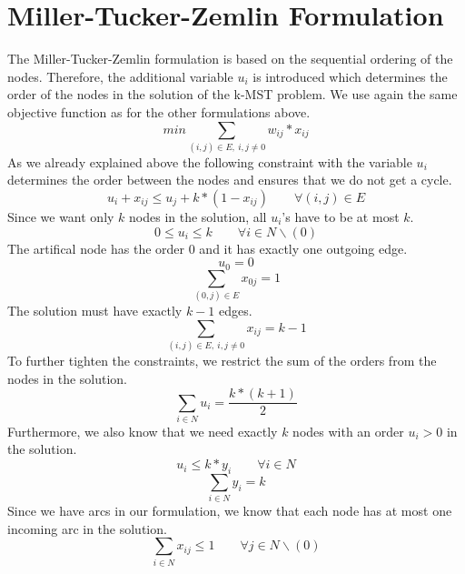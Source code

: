 \documentclass [11pt]{article}
\begin{document}
\section{Miller-Tucker-Zemlin Formulation}
The Miller-Tucker-Zemlin formulation is based on the sequential ordering
of the nodes.
Therefore, the additional variable $u_i$ is introduced
which determines the order of the nodes in the solution
of the k-MST problem.
We use again the same objective function as for the other formulations above.
\begin{equation}
  min \sum_{(i,j) \in E , \ i,j \not = 0} {w_{ij} * x_{ij}}
\end{equation}
As we already explained above the following constraint with the variable
$u_i$ determines the order between the nodes and ensures that we do
not get a cycle.
\begin{equation}
  u_{i} + x_{ij} \leq u_{j} + k*(1- x_{ij}) \qquad \forall (i,j) \in E 
\end{equation}
Since we want only $k$ nodes in the solution, all $u_i$'s have to be
at most $k$.
\begin{equation}
  0 \leq u_i \leq k \qquad \forall i \in N \backslash (0) 
\end{equation}
The artifical node has the order $0$ and it has exactly one outgoing edge.
\begin{equation}
  u_0 = 0 
\end{equation}
\begin{equation}
  \sum_{(0,j) \in E} x_{0j} = 1 
\end{equation}
The solution must have exactly $k-1$ edges.
\begin{equation}
  \sum_{(i,j) \in E, \ i,j \not =  0} x_{ij} = k-1 
\end{equation}
To further tighten the constraints, we restrict the sum of the orders
from the nodes in the solution.
\begin{equation}
  \sum_{i \in N} u_i = \frac{k*(k+1)}{2} 
\end{equation}
Furthermore, we also know that we need exactly $k$ nodes with an
order $u_i > 0$ in the solution.
\begin{equation}
  u_i \leq k*y_i \qquad \forall i \in N
\end{equation}
\begin{equation}
  \sum_{i \in N} y_i = k
\end{equation}
Since we have arcs in our formulation, we know that each node 
has at most one incoming arc in the solution. 
\begin{equation}
  \sum_{i \in N} {x_{ij}} \leq 1 \qquad \forall j \in N \backslash (0)
\end{equation}
\end{document}
